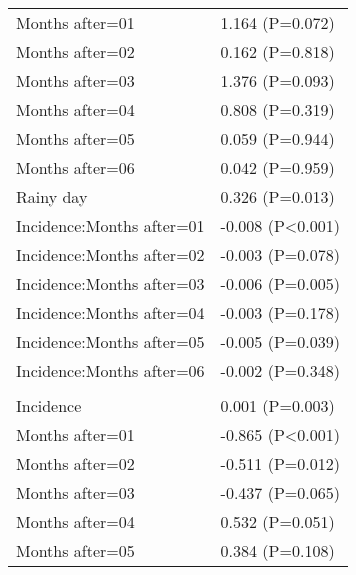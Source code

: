 \documentclass[]{article}
\begin{document}
\begin{longtable}[t]{ll}
\hspace{1em}Months after=01 & 1.164 (P=0.072)\\
\hspace{1em}Months after=02 & 0.162 (P=0.818)\\
\hspace{1em}Months after=03 & 1.376 (P=0.093)\\
\hspace{1em}Months after=04 & 0.808 (P=0.319)\\
\hspace{1em}Months after=05 & 0.059 (P=0.944)\\
\hspace{1em}Months after=06 & 0.042 (P=0.959)\\
\hspace{1em}Rainy day & 0.326 (P=0.013)\\
\hspace{1em}Incidence:Months after=01 & -0.008 (P<0.001)\\
\hspace{1em}Incidence:Months after=02 & -0.003 (P=0.078)\\
\hspace{1em}Incidence:Months after=03 & -0.006 (P=0.005)\\
\hspace{1em}Incidence:Months after=04 & -0.003 (P=0.178)\\
\hspace{1em}Incidence:Months after=05 & -0.005 (P=0.039)\\
\hspace{1em}Incidence:Months after=06 & -0.002 (P=0.348)\\
\addlinespace[1.5em]
\multicolumn{2}{l}{\textbf{Temporary field worker}}\\
\hspace{1em}Incidence & 0.001 (P=0.003)\\
\hspace{1em}Months after=01 & -0.865 (P<0.001)\\
\hspace{1em}Months after=02 & -0.511 (P=0.012)\\
\hspace{1em}Months after=03 & -0.437 (P=0.065)\\
\hspace{1em}Months after=04 & 0.532 (P=0.051)\\
\hspace{1em}Months after=05 & 0.384 (P=0.108)\\

\end{longtable}
\end{document}
